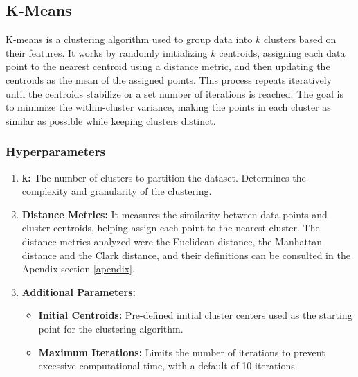 \subsection{K-Means}\label{sec:kmeans}
K-means is a clustering algorithm used to group data into \(k\) clusters based on their features. It works by randomly 
initializing \(k\) centroids, assigning each data point to the nearest centroid using a distance metric, and then updating
 the centroids as the mean of the assigned points. This process repeats iteratively until the centroids stabilize or a set
  number of iterations is reached. The goal is to minimize the within-cluster variance, making the points in each cluster
   as similar as possible while keeping clusters distinct.

\subsubsection{Hyperparameters}
\begin{enumerate}
    \item \textbf{k:} The number of clusters to partition the dataset. Determines the complexity and granularity of the clustering.
    \item \textbf{Distance Metrics:} It measures the similarity between data points and cluster centroids, helping assign each point to the nearest 
    cluster. The distance metrics analyzed were the Euclidean distance, the Manhattan distance and the Clark distance, and
    their definitions can be consulted in the Apendix section \ref{apendix}.

    \item \textbf{Additional Parameters:}
    \begin{itemize}
        \item \textbf{Initial Centroids:} Pre-defined initial cluster centers used as the starting point for the clustering algorithm.
        \item \textbf{Maximum Iterations:} Limits the number of iterations to prevent excessive computational time, with a default of 10 iterations.
    \end{itemize}
\end{enumerate}


